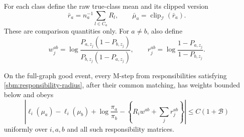 For each class define the raw true-class mean and its clipped version
\[
 \bar r_a=n_a^{-1}\sum_{l\in C_a}R_l,
 \qquad \bar\mu_a=\operatorname{clip}_{\mathcal I}(\bar r_a).
\]
These are comparison quantities only. For $a\ne b$, also define
\begin{equation}
 w_j^{ab}=\log\frac{P_{a,z_j}(1-P_{b,z_j})}
                         {P_{b,z_j}(1-P_{a,z_j})},
 \qquad
 r_j^{ab}=\log\frac{1-P_{a,z_j}}{1-P_{b,z_j}}.
 \label{sbm:true-weights}
\end{equation}

\begin{lemma}
\label{sbm:fitted-score}
On the full-graph good event, every M-step from responsibilities
satisfying \eqref{sbm:responsibility-radius}, after their common
matching, has weights bounded below and obeys
\begin{equation}
 \left|
 \ell_i(\mu_a)-\ell_i(\mu_b)+\log\frac{\pi_a}{\pi_b}
 -\left\{R_iw^{ab}+\sum_jr_j^{ab}\right\}
 \right|
 \le C(1+\mathcal B)
 \label{sbm:fitted-score-bound}
\end{equation}
uniformly over $i,a,b$ and all such responsibility matrices.
\end{lemma}

